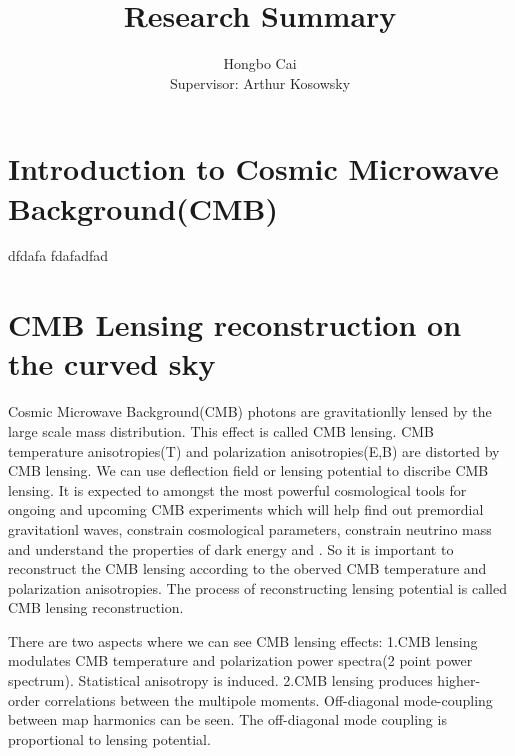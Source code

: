 \documentclass[12pt, notitlepage, onecolumn, amsmath, amssymb, aps]{revtex4-1}
\title{}
\begin{document}
\title{Research Summary}
\author{Hongbo Cai \\{\small Supervisor: Arthur Kosowsky}}
\maketitle
\newcommand{\edit}[1]{\textcolor{red}{(#1)}}
\vspace{-1.5cm}
\section{Introduction to Cosmic Microwave Background(CMB)}
\label{sec:org8852578}

dfdafa
fdafadfad



\section{CMB Lensing reconstruction on the curved sky}
\label{sec:org8852578}


Cosmic Microwave Background(CMB) photons are gravitationlly lensed by the large scale mass distribution. This effect is called CMB lensing. CMB temperature anisotropies(T) and polarization anisotropies(E,B) are distorted by CMB lensing. We can use deflection field or lensing potential to discribe CMB lensing\cite{Lewis:2006fu}. It is expected to amongst the most powerful cosmological tools for ongoing and upcoming CMB experiments which will help find out premordial gravitationl waves, constrain cosmological parameters, constrain neutrino mass and understand the properties of dark energy and . So it is important to reconstruct the CMB lensing according to the oberved CMB temperature and polarization anisotropies. The process of reconstructing lensing potential is called CMB lensing reconstruction.

There are two aspects where we can see CMB lensing effects:
1.CMB lensing modulates CMB temperature and polarization power spectra(2 point power spectrum). Statistical anisotropy is induced.
2.CMB lensing produces higher-order correlations between the multipole moments. Off-diagonal mode-coupling between map harmonics can be seen. The off-diagonal mode coupling is proportional to lensing potential.\cite{Hu:2001kj}
\end{document}
